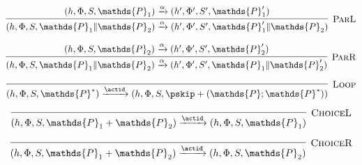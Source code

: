 \[
\infer[\textsc{ParL}]
{
	 (h, \Phi, S, \mathds{P}_1 \| \mathds{P}_2)
	\xrightarrow{\alpha}
	(h', \Phi', S', \mathds{P}_1' \| \mathds{P}_2)
}
{
	 (h, \Phi, S, \mathds{P}_1)
	\xrightarrow{\alpha}
	(h', \Phi', S', \mathds{P}_1')
}
\]

\[
\infer[\textsc{ParR}]
{
	 (h, \Phi, S, \mathds{P}_1 \| \mathds{P}_2)
	\xrightarrow{\alpha}
	(h', \Phi', S', \mathds{P}_1 \| \mathds{P}_2')
}
{
	 (h, \Phi, S, \mathds{P}_2)
	\xrightarrow{\alpha}
	(h', \Phi', S', \mathds{P}_2')
}
\]

\[
\infer[\textsc{Loop}]
{
	 (h, \Phi, S, \mathds{P}^*)
	\xrightarrow{\actid}
	(h, \Phi, S, \pskip + (\mathds{P} ; \mathds{P}^*))
}
{}
\]

\[
\infer[\textsc{ChoiceL}]
{
	 (h, \Phi, S, \mathds{P}_1 + \mathds{P}_2)
	\xrightarrow{\actid}
	(h, \Phi, S, \mathds{P}_1)
}
{}
\]

\[
\infer[\textsc{ChoiceR}]
{
	 (h, \Phi, S, \mathds{P}_1 + \mathds{P}_2)
	\xrightarrow{\actid}
	(h, \Phi, S, \mathds{P}_2)
}
{}
\]
